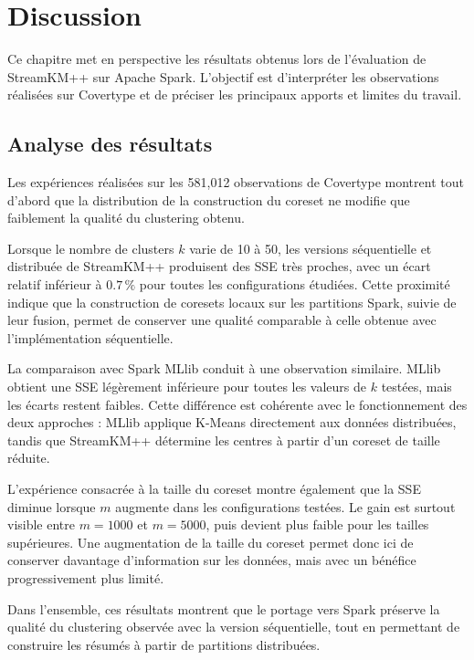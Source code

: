 
\chapter{Discussion}
\label{ch:discussion}

Ce chapitre met en perspective les résultats obtenus lors de l'évaluation de StreamKM++ sur Apache Spark. L'objectif est d'interpréter les observations réalisées sur Covertype et de préciser les principaux apports et limites du travail.

\section{Analyse des résultats}

Les expériences réalisées sur les 581,012 observations de Covertype montrent tout d'abord que la distribution de la construction du coreset ne modifie que faiblement la qualité du clustering obtenu.

Lorsque le nombre de clusters \(k\) varie de 10 à 50, les versions séquentielle et distribuée de StreamKM++ produisent des SSE très proches, avec un écart relatif inférieur à \(0.7\,\%\) pour toutes les configurations étudiées. Cette proximité indique que la construction de coresets locaux sur les partitions Spark, suivie de leur fusion, permet de conserver une qualité comparable à celle obtenue avec l'implémentation séquentielle.

La comparaison avec Spark MLlib conduit à une observation similaire. MLlib obtient une SSE légèrement inférieure pour toutes les valeurs de \(k\) testées, mais les écarts restent faibles. Cette différence est cohérente avec le fonctionnement des deux approches : MLlib applique K-Means directement aux données distribuées, tandis que StreamKM++ détermine les centres à partir d'un coreset de taille réduite.

L'expérience consacrée à la taille du coreset montre également que la SSE diminue lorsque \(m\) augmente dans les configurations testées. Le gain est surtout visible entre \(m=1000\) et \(m=5000\), puis devient plus faible pour les tailles supérieures. Une augmentation de la taille du coreset permet donc ici de conserver davantage d'information sur les données, mais avec un bénéfice progressivement plus limité.

Dans l'ensemble, ces résultats montrent que le portage vers Spark préserve la qualité du clustering observée avec la version séquentielle, tout en permettant de construire les résumés à partir de partitions distribuées.

